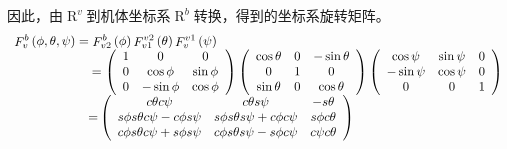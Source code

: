 因此，由$\mathop R\nolimits^v $到机体坐标系$\mathop R\nolimits^b $转换，得到的坐标系旋转矩阵。
\[\begin{array}{l}
\mathop F\nolimits_v^b \left( {\phi ,\theta ,\psi } \right) = \mathop F\nolimits_{v2}^b \left( \phi  \right)\mathop F\nolimits_{v1}^{v2} \left( \theta  \right)\mathop F\nolimits_v^{v1} \left( \psi  \right)\\
{\kern 1pt} {\kern 1pt} {\kern 1pt} {\kern 1pt} {\kern 1pt} {\kern 1pt} {\kern 1pt} {\kern 1pt} {\kern 1pt} {\kern 1pt} {\kern 1pt} {\kern 1pt} {\kern 1pt} {\kern 1pt} {\kern 1pt} {\kern 1pt} {\kern 1pt} {\kern 1pt} {\kern 1pt} {\kern 1pt} {\kern 1pt} {\kern 1pt} {\kern 1pt} {\kern 1pt} {\kern 1pt} {\kern 1pt} {\kern 1pt} {\kern 1pt} {\kern 1pt} {\kern 1pt} {\kern 1pt} {\kern 1pt} {\kern 1pt} {\kern 1pt} {\kern 1pt} {\kern 1pt} {\kern 1pt} {\kern 1pt} {\kern 1pt} {\kern 1pt} {\kern 1pt} {\kern 1pt} {\kern 1pt} {\kern 1pt} {\kern 1pt} {\kern 1pt} {\kern 1pt} {\kern 1pt} {\kern 1pt} {\kern 1pt} {\kern 1pt} {\kern 1pt} {\kern 1pt} {\kern 1pt} {\kern 1pt} {\kern 1pt} {\kern 1pt} {\kern 1pt}  = \left( {\begin{array}{*{20}{c}}
1&0&0\\
0&{\cos \phi }&{\sin \phi }\\
0&{ - \sin \phi }&{\cos \phi }
\end{array}} \right)\left( {\begin{array}{*{20}{c}}
{\cos \theta }&0&{ - \sin \theta }\\
0&1&0\\
{\sin \theta }&0&{\cos \theta }
\end{array}} \right)\left( {\begin{array}{*{20}{c}}
{\cos \psi }&{\sin \psi }&0\\
{ - \sin \psi }&{\cos \psi }&0\\
0&0&1
\end{array}} \right)\\
{\kern 1pt} {\kern 1pt} {\kern 1pt} {\kern 1pt} {\kern 1pt} {\kern 1pt} {\kern 1pt} {\kern 1pt} {\kern 1pt} {\kern 1pt} {\kern 1pt} {\kern 1pt} {\kern 1pt} {\kern 1pt} {\kern 1pt} {\kern 1pt} {\kern 1pt} {\kern 1pt} {\kern 1pt} {\kern 1pt} {\kern 1pt} {\kern 1pt} {\kern 1pt} {\kern 1pt} {\kern 1pt} {\kern 1pt} {\kern 1pt} {\kern 1pt} {\kern 1pt} {\kern 1pt} {\kern 1pt} {\kern 1pt} {\kern 1pt} {\kern 1pt} {\kern 1pt} {\kern 1pt} {\kern 1pt} {\kern 1pt} {\kern 1pt} {\kern 1pt} {\kern 1pt} {\kern 1pt} {\kern 1pt} {\kern 1pt} {\kern 1pt} {\kern 1pt} {\kern 1pt} {\kern 1pt} {\kern 1pt} {\kern 1pt} {\kern 1pt} {\kern 1pt} {\kern 1pt} {\kern 1pt} {\kern 1pt} {\kern 1pt} {\kern 1pt} {\kern 1pt} {\rm{ = }}\left( {\begin{array}{*{20}{c}}
{c\theta c\psi }&{c\theta s\psi }&{ - s\theta }\\
{s\phi s\theta c\psi  - c\phi s\psi }&{s\phi s\theta s\psi  + c\phi c\psi }&{s\phi c\theta }\\
{c\phi s\theta c\psi  + s\phi s\psi }&{c\phi s\theta s\psi  - s\phi c\psi }&{c\psi c\theta }
\end{array}} \right)
\end{array}\]

